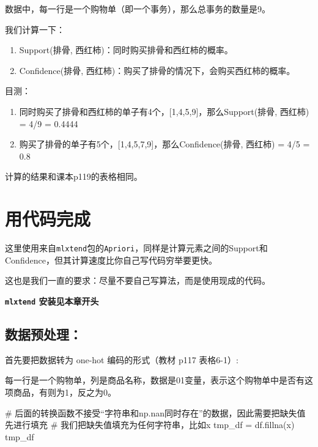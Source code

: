 \documentclass[
  letterpaper,
  DIV=11,
  numbers=noendperiod]{scrreprt}
\newenvironment{Shaded}{\begin{snugshade}}{\end{snugshade}}
\newcommand{\CommentTok}[1]{\textcolor[rgb]{0.37,0.37,0.37}{#1}}
\newcommand{\NormalTok}[1]{\textcolor[rgb]{0.00,0.23,0.31}{#1}}
\newcommand{\OperatorTok}[1]{\textcolor[rgb]{0.37,0.37,0.37}{#1}}
\newcommand{\StringTok}[1]{\textcolor[rgb]{0.13,0.47,0.30}{#1}}
\providecommand{\tightlist}{%
  \setlength{\itemsep}{0pt}\setlength{\parskip}{0pt}}\usepackage{longtable,booktabs,array}
\begin{document}
数据中，每一行是一个购物单（即一个事务），那么总事务的数量是9。

我们计算一下：

\begin{enumerate}
\def\labelenumi{\arabic{enumi}.}
\tightlist
\item
  Support(排骨, 西红柿)：同时购买排骨和西红柿的概率。
\item
  Confidence(排骨, 西红柿)：购买了排骨的情况下，会购买西红柿的概率。
\end{enumerate}

目测：

\begin{enumerate}
\def\labelenumi{\arabic{enumi}.}
\tightlist
\item
  同时购买了排骨和西红柿的单子有4个，{[}1,4,5,9{]}，那么Support(排骨,
  西红柿) = 4/9 = 0.4444
\item
  购买了排骨的单子有5个，{[}1,4,5,7,9{]}，那么Confidence(排骨, 西红柿) =
  4/5 = 0.8
\end{enumerate}

计算的结果和课本p119的表格相同。

\hypertarget{ux7528ux4ee3ux7801ux5b8cux6210}{%
\section{用代码完成}\label{ux7528ux4ee3ux7801ux5b8cux6210}}

这里使用来自\texttt{mlxtend}包的\texttt{Apriori}，同样是计算元素之间的Support和Confidence，但其计算速度比你自己写代码穷举要更快。

这也是我们一直的要求：尽量不要自己写算法，而是使用现成的代码。

\textbf{\texttt{mlxtend} 安装见本章开头}

\hypertarget{ux6570ux636eux9884ux5904ux7406}{%
\subsection{数据预处理：}\label{ux6570ux636eux9884ux5904ux7406}}

首先要把数据转为 one-hot 编码的形式（教材 p117 表格6-1）:

每一行是一个购物单，列是商品名称，数据是01变量，表示这个购物单中是否有这项商品，有则为1，反之为0。

\begin{Shaded}
\begin{Highlighting}[]
\CommentTok{\# 后面的转换函数不接受“字符串和np.nan同时存在”的数据，因此需要把缺失值先进行填充}
\CommentTok{\# 我们把缺失值填充为任何字符串，比如\textquotesingle{}x\textquotesingle{}}
\NormalTok{tmp\_df }\OperatorTok{=}\NormalTok{ df.fillna(}\StringTok{\textquotesingle{}x\textquotesingle{}}\NormalTok{)}
\NormalTok{tmp\_df}
\end{Highlighting}
\end{Shaded}
\end{document}
